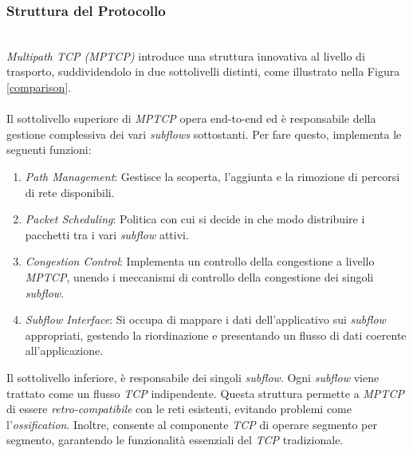 \subsubsection{Struttura del Protocollo}
~\\
\indent \emph{Multipath TCP (MPTCP)} introduce una struttura innovativa al livello di trasporto, suddividendolo in due sottolivelli distinti, come illustrato nella Figura \ref{comparison}.
\\\\
Il sottolivello superiore di \emph{MPTCP} opera end-to-end ed è responsabile della gestione complessiva dei vari \emph{subflows} sottostanti. Per fare questo, implementa le seguenti funzioni:
\begin{enumerate}[label=\roman*]
    \item \emph{Path Management}: Gestisce la scoperta, l'aggiunta e la rimozione di percorsi di rete disponibili.
    \item \emph{Packet Scheduling}: Politica con cui si decide in che modo distribuire i pacchetti tra i vari \emph{subflow} attivi.
    \item \emph{Congestion Control}: Implementa un controllo della congestione a livello \emph{MPTCP}, unendo i meccanismi di controllo della congestione dei singoli \emph{subflow}. 
    \item \emph{Subflow Interface}: Si occupa di mappare i dati dell'applicativo sui \emph{subflow} appropriati, gestendo la riordinazione e presentando un flusso di dati coerente all'applicazione.
\end{enumerate}
\noindent Il sottolivello inferiore, è responsabile dei singoli \emph{subflow}. Ogni \emph{subflow} viene trattato come un flusso \emph{TCP} indipendente. Questa struttura permette a \emph{MPTCP} di essere \emph{retro-compatibile} con le reti esistenti, evitando problemi come l'\emph{ossification}. Inoltre, consente al componente \emph{TCP} di operare segmento per segmento, garantendo le funzionalità essenziali del \emph{TCP} tradizionale.
